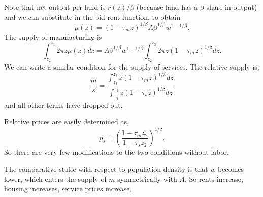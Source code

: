 \documentclass[letter]{amsart}
\theoremstyle{definition}
\theoremstyle{remark}
\numberwithin{equation}{section}
\begin{document}
Note that net output per land is $r(z)/\beta$ (because land has a $\beta$ share in output) and we can substitute in the bid rent function, to obtain
\[
\mu(z) = (1-\tau_m z)^{1/\beta}A {\beta}^{1/\beta}w^{1-1/\beta}.
\]
The supply of manufacturing is
\[
\int_{z_2}^{z_3} 2\pi z\mu(z) dz = A {\beta}^{1/\beta}w^{1-1/\beta}\int_{z_2}^{z_3} 2\pi z(1-\tau_m z)^{1/\beta} dz.
\]
We can write a similar condition for the supply of services. The relative supply is,
\[
\frac ms = \frac{\int_{z_2}^{z_3} z(1-\tau_m z)^{1/\beta} dz}{\int_{z_1}^{z_2} z(1-\tau_s z)^{1/\beta} dz}
\]
and all other terms have dropped out.

Relative prices are easily determined as,
\[
p_s = \left(\frac{1-\tau_m z_2}{1-\tau_s z_2}\right)^{1/\beta}.
\]
So there are very few modifications to the two conditions without labor.

The comparative static with respect to population density is that $w$ becomes lower, which enters the supply of $m$ symmetrically with $A$. So rents increase, housing increases, service prices increase.
\end{document}
